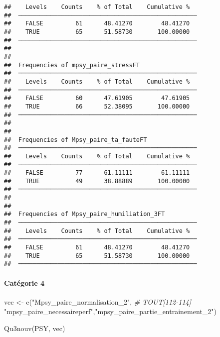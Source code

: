 \documentclass[
]{article}
\newenvironment{Shaded}{\begin{snugshade}}{\end{snugshade}}
\newcommand{\CommentTok}[1]{\textcolor[rgb]{0.56,0.35,0.01}{\textit{#1}}}
\newcommand{\FunctionTok}[1]{\textcolor[rgb]{0.00,0.00,0.00}{#1}}
\newcommand{\NormalTok}[1]{#1}
\newcommand{\OtherTok}[1]{\textcolor[rgb]{0.56,0.35,0.01}{#1}}
\newcommand{\StringTok}[1]{\textcolor[rgb]{0.31,0.60,0.02}{#1}}
\begin{document}
\begin{verbatim}
##    Levels    Counts    % of Total    Cumulative %   
##  ────────────────────────────────────────────────── 
##    FALSE         61      48.41270        48.41270   
##    TRUE          65      51.58730       100.00000   
##  ────────────────────────────────────────────────── 
## 
## 
##  Frequencies of mpsy_paire_stressFT                 
##  ────────────────────────────────────────────────── 
##    Levels    Counts    % of Total    Cumulative %   
##  ────────────────────────────────────────────────── 
##    FALSE         60      47.61905        47.61905   
##    TRUE          66      52.38095       100.00000   
##  ────────────────────────────────────────────────── 
## 
## 
##  Frequencies of Mpsy_paire_ta_fauteFT               
##  ────────────────────────────────────────────────── 
##    Levels    Counts    % of Total    Cumulative %   
##  ────────────────────────────────────────────────── 
##    FALSE         77      61.11111        61.11111   
##    TRUE          49      38.88889       100.00000   
##  ────────────────────────────────────────────────── 
## 
## 
##  Frequencies of Mpsy_paire_humiliation_3FT          
##  ────────────────────────────────────────────────── 
##    Levels    Counts    % of Total    Cumulative %   
##  ────────────────────────────────────────────────── 
##    FALSE         61      48.41270        48.41270   
##    TRUE          65      51.58730       100.00000   
##  ──────────────────────────────────────────────────
\end{verbatim}

\hypertarget{catuxe9gorie-4}{%
\paragraph{Catégorie 4}\label{catuxe9gorie-4}}

\begin{Shaded}
\begin{Highlighting}[]
\NormalTok{vec }\OtherTok{\textless{}{-}} \FunctionTok{c}\NormalTok{(}\StringTok{"Mpsy\_paire\_normalisation\_2"}\NormalTok{,  }\CommentTok{\# TOUT[112{-}114]}
         \StringTok{"mpsy\_paire\_necessaireperf"}\NormalTok{,}\StringTok{"mpsy\_paire\_partie\_entrainement\_2"}\NormalTok{) }

\FunctionTok{Qu3nouv}\NormalTok{(PSY, vec)}
\end{Highlighting}
\end{Shaded}
\end{document}
